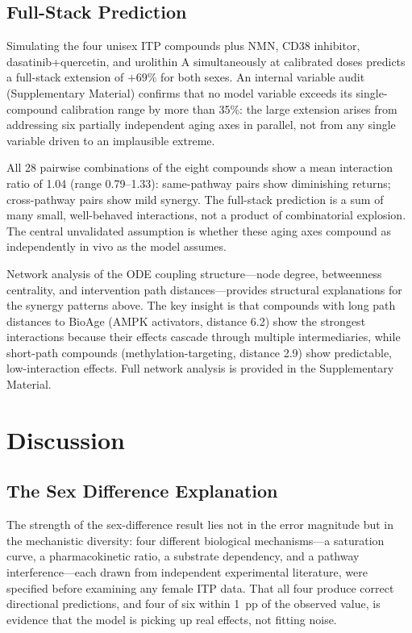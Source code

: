 \documentclass[11pt]{article}
\begin{document}

\subsection{Full-Stack Prediction}

Simulating the four unisex ITP compounds plus NMN, CD38 inhibitor, dasatinib+quercetin, and urolithin A simultaneously at calibrated doses predicts a full-stack extension of $+69\%$ for both sexes. An internal variable audit (Supplementary Material) confirms that no model variable exceeds its single-compound calibration range by more than 35\%: the large extension arises from addressing six partially independent aging axes in parallel, not from any single variable driven to an implausible extreme.

All 28 pairwise combinations of the eight compounds show a mean interaction ratio of 1.04 (range 0.79--1.33): same-pathway pairs show diminishing returns; cross-pathway pairs show mild synergy. The full-stack prediction is a sum of many small, well-behaved interactions, not a product of combinatorial explosion. The central unvalidated assumption is whether these aging axes compound as independently in vivo as the model assumes.

Network analysis of the ODE coupling structure---node degree, betweenness centrality, and intervention path distances---provides structural explanations for the synergy patterns above. The key insight is that compounds with long path distances to BioAge (AMPK activators, distance 6.2) show the strongest interactions because their effects cascade through multiple intermediaries, while short-path compounds (methylation-targeting, distance 2.9) show predictable, low-interaction effects. Full network analysis is provided in the Supplementary Material.


\section{Discussion}

\subsection{The Sex Difference Explanation}

The strength of the sex-difference result lies not in the error magnitude but in the mechanistic diversity: four different biological mechanisms---a saturation curve, a pharmacokinetic ratio, a substrate dependency, and a pathway interference---each drawn from independent experimental literature, were specified before examining any female ITP data. That all four produce correct directional predictions, and four of six within 1~pp of the observed value, is evidence that the model is picking up real effects, not fitting noise.
\end{document}
